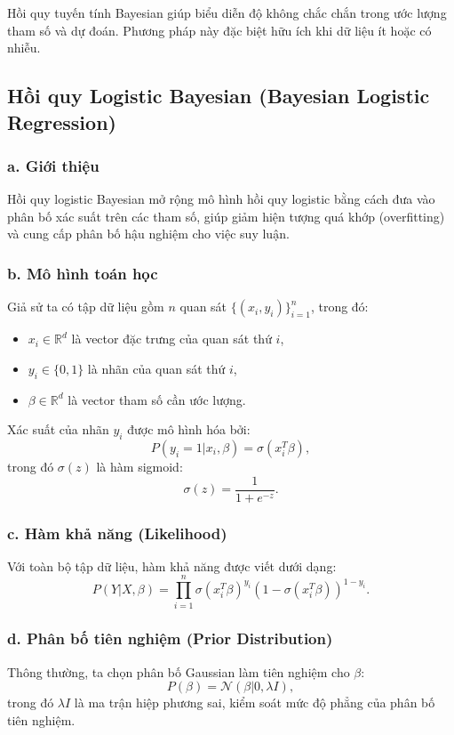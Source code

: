 Hồi quy tuyến tính Bayesian giúp biểu diễn độ không chắc chắn trong ước lượng tham số và dự đoán. Phương pháp này đặc biệt hữu ích khi dữ liệu ít hoặc có nhiễu.


\subsection{Hồi quy Logistic Bayesian (Bayesian Logistic Regression)}
\subsubsection{a. Giới thiệu}
Hồi quy logistic Bayesian mở rộng mô hình hồi quy logistic bằng cách đưa vào phân bố xác suất trên các tham số, giúp giảm hiện tượng quá khớp (overfitting) và cung cấp phân bố hậu nghiệm cho việc suy luận.

\subsubsection{b. Mô hình toán học}
Giả sử ta có tập dữ liệu gồm $n$ quan sát $\{(x_i, y_i)\}_{i=1}^{n}$, trong đó:
\begin{itemize}
    \item $x_i \in \mathbb{R}^d$ là vector đặc trưng của quan sát thứ $i$,
    \item $y_i \in \{0,1\}$ là nhãn của quan sát thứ $i$,
    \item $\beta \in \mathbb{R}^d$ là vector tham số cần ước lượng.
\end{itemize}

Xác suất của nhãn $y_i$ được mô hình hóa bởi:
\begin{equation}
    P(y_i = 1 | x_i, \beta) = \sigma(x_i^T \beta),
\end{equation}
trong đó $\sigma(z)$ là hàm sigmoid:
\begin{equation}
    \sigma(z) = \frac{1}{1 + e^{-z}}.
\end{equation}

\subsubsection{c. Hàm khả năng (Likelihood)}
Với toàn bộ tập dữ liệu, hàm khả năng được viết dưới dạng:
\begin{equation}
    P(Y | X, \beta) = \prod_{i=1}^{n} \sigma(x_i^T \beta)^{y_i} (1 - \sigma(x_i^T \beta))^{1 - y_i}.
\end{equation}

\subsubsection{d. Phân bố tiên nghiệm (Prior Distribution)}
Thông thường, ta chọn phân bố Gaussian làm tiên nghiệm cho $\beta$:
\begin{equation}
    P(\beta) = \mathcal{N}(\beta | 0, \lambda I),
\end{equation}
trong đó $\lambda I$ là ma trận hiệp phương sai, kiểm soát mức độ phẳng của phân bố tiên nghiệm.

